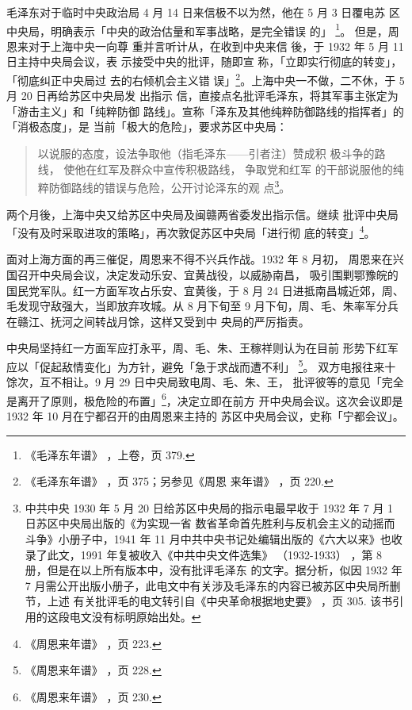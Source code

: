 毛泽东对于临时中央政治局 4 月 14 日来信极不以为然，他在 5 月 3 日覆电苏
区中央局，明确表示「中央的政治估量和军事战略，是完全错误 的」
\footnote{《毛泽东年谱》 ，上卷，页 379.}。 但是，周恩来对于上海中央一向尊
重并言听计从，在收到中央来信 後，于 1932 年 5 月 11 日主持中央局会议，表
示接受中央的批评，随即宣 称，「立即实行彻底的转变」，「彻底纠正中央局过
去的右倾机会主义错 误」\footnote{《毛泽东年谱》 ，页 375；另参见《周恩
来年谱》 ，页 220.}。上海中央一不做，二不休，于 5 月 20 日再给苏区中央局发
出指示 信，直接点名批评毛泽东，将其军事主张定为「游击主义」和「纯粹防御
路线」。宣称「泽东及其他纯粹防御路线的指挥者」的「消极态度」，是
当前「极大的危险」，要求苏区中央局：
\begin{quote}
	\fzwkai 以说服的态度，设法争取他（指毛泽东——引者注）赞成积
极斗争的路线，
使他在红军及群众中宣传积极路线，
争取党和红军
的干部说服他的纯粹防御路线的错误与危险，公开讨论泽东的观
点\footnote{ 中共中央 1930 年 5 月 20 日给苏区中央局的指示电最早收于 1932 年 7 月 1 日苏区中央局出版的《为实现一省
数省革命首先胜利与反机会主义的动摇而斗争》小册子中，1941 年 11 月中共中央书记处编辑出版的《六大以来》也收
录了此文，1991 年复被收入《中共中央文件选集》
（1932-1933）
，第 8 册，但是在以上所有版本中，没有批评毛泽东
的文字。据分析，似因 1932 年 7 月需公开出版小册子，此电文中有关涉及毛泽东的内容已被苏区中央局所删节，上述
有关批评毛的电文转引自《中央革命根据地史要》
，页 305. 该书引用的这段电文没有标明原始出处。
}。
\end{quote}

两个月後，上海中央又给苏区中央局及闽赣两省委发出指示信。继续
批评中央局「没有及时采取进攻的策略」，再次敦促苏区中央局「进行彻
底的转变」\footnote{《周恩来年谱》
，页 223.}。

面对上海方面的再三催促，周恩来不得不兴兵作战。1932 年 8 月初，
周恩来在兴国召开中央局会议，决定发动乐安、宜黄战役，以威胁南昌，
吸引围剿鄂豫皖的国民党军队。红一方面军攻占乐安、宜黄後，于 8 月 24
日进抵南昌城近郊，周、毛发现守敌强大，当即放弃攻城。从 8 月下旬至 9
月下旬，周、毛、朱率军分兵在赣江、抚河之间转战月馀，这样又受到中
央局的严厉指责。

中央局坚持红一方面军应打永平，周、毛、朱、王稼祥则认为在目前
形势下红军应以「促起敌情变化」为方针，避免「急于求战而遭不利」
\footnote{《周恩来年谱》
，页 228.}。
双方电报往来十馀次，互不相让。9 月 29 日中央局致电周、毛、朱、王，
批评彼等的意见「完全是离开了原则，极危险的布置」\footnote{《周恩来年谱》
，页 230.}，决定立即在前方
开中央局会议。这次会议即是 1932 年 10 月在宁都召开的由周恩来主持的
苏区中央局会议，史称「宁都会议」。

